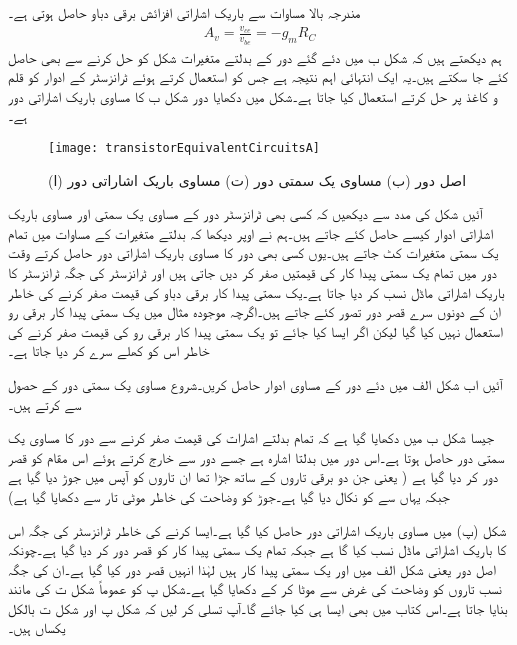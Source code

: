 مندرجہ بالا مساوات سے باریک اشاراتی افزائش برقی دباو  حاصل ہوتی ہے۔
\begin{align}
A_v=\frac{v_{ce}}{v_{be}}=-g_m R_C
\end{align}
ہم دیکھتے ہیں کہ شکل  ب میں دئے گئے دور کے بدلتے متغیرات شکل   کو حل کرنے سے بھی حاصل کئے جا سکتے ہیں۔یہ ایک انتہائی اہم نتیجہ ہے جس کو استعمال کرتے ہوئے ٹرانزسٹر کے ادوار کو قلم و کاغذ پر حل کرتے استعمال کیا جاتا ہے۔شکل   میں دکھایا دور شکل  ب کا مساوی باریک اشاراتی دور ہے۔

\begin{figure}
\centering
\texttt{[image: transistorEquivalentCircuitsA]}
\caption{(ا) اصل دور (ب) مساوی یک سمتی دور (ت) مساوی باریک اشاراتی دور}
\label{شکل_مساوی_دور_الف}
\end{figure}
آئیں شکل   کی مدد سے دیکھیں کہ کسی بھی ٹرانزسٹر دور کے مساوی یک سمتی اور مساوی باریک اشاراتی ادوار کیسے حاصل کئے جاتے ہیں۔ہم نے اوپر دیکھا کہ بدلتے متغیرات کے مساوات میں تمام یک سمتی متغیرات کٹ جاتے ہیں۔یوں کسی بھی دور کا مساوی باریک اشاراتی دور حاصل کرتے وقت دور میں تمام یک سمتی پیدا کار کی قیمتیں صفر کر دیں جاتی ہیں اور ٹرانزسٹر کی جگہ ٹرانزسٹر کا باریک اشاراتی ماڈل نسب کر دیا جاتا ہے۔یک سمتی پیدا کار برقی دباو کی قیمت صفر کرنے کی خاطر ان کے دونوں سرے قصر دور تصور کئے جاتے ہیں۔اگرچہ موجودہ مثال میں یک سمتی پیدا کار برقی رو استعمال نہیں کیا گیا لیکن اگر ایسا کیا جائے تو یک سمتی پیدا کار برقی رو کی قیمت صفر کرنے کی خاطر اس کو کھلے سرے کر دیا جاتا ہے۔

آئیں اب شکل  الف میں دئے دور کے مساوی ادوار حاصل کریں۔شروع مساوی یک سمتی دور کے حصول سے کرتے ہیں۔
	

جیسا شکل  ب میں دکھایا گیا ہے کہ تمام بدلتے اشارات کی قیمت صفر کرنے سے  دور کا مساوی یک سمتی دور حاصل ہوتا ہے۔اس دور میں  بدلتا اشارہ ہے جسے دور سے خارج کرتے ہوئے اس مقام کو قصر دور کر دیا گیا ہے ( یعنی جن دو برقی تاروں کے ساتھ  جڑا تھا ان تاروں کو آپس میں جوڑ دیا گیا ہے جبکہ یہاں سے  کو نکال دیا گیا ہے۔جوڑ کو وضاحت کی خاطر موٹی تار سے دکھایا گیا ہے)

شکل (پ) میں مساوی باریک اشاراتی دور حاصل کیا گیا ہے۔ایسا کرنے کی خاطر ٹرانزسٹر کی جگہ اس کا باریک اشاراتی  ماڈل  نسب کیا گا ہے جبکہ تمام یک سمتی پیدا کار کو قصر دور کر دیا گیا ہے۔چونکہ اصل دور یعنی شکل  الف   میں  اور  یک سمتی پیدا کار ہیں لہٰذا انہیں قصر دور کیا گیا ہے۔ان کی جگہ نسب تاروں کو وضاحت کی غرض سے موٹا کر کے دکھایا گیا ہے۔شکل  پ کو عموماً شکل  ت کی مانند بنایا جاتا ہے۔اس کتاب میں بھی  ایسا ہی کیا جائے گا۔آپ تسلی کر لیں کہ شکل  پ اور شکل  ت بالکل یکساں ہیں۔

